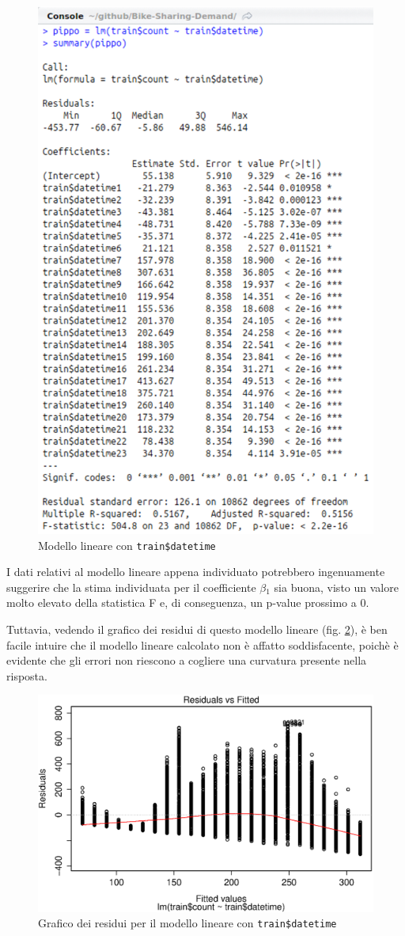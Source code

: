 \begin{figure}[H]
  \centering
  \includegraphics[width=.5\columnwidth]{images/lm/simplest-linear-model.eps}
  \caption{Modello lineare con \texttt{train\$datetime}}
  \label{fig:simplest-linear-model}
\end{figure}

I dati relativi al modello lineare appena individuato potrebbero ingenuamente
suggerire che la stima individuata per il coefficiente $\beta{}_1$ sia buona,
visto un valore molto elevato della statistica F e, di conseguenza, un p-value
prossimo a 0.

Tuttavia, vedendo il grafico dei residui di questo modello lineare (fig.
\ref{fig:simpl-mod-lin-residuals}), è ben facile intuire che il modello lineare
calcolato non è affatto soddisfacente, poichè è evidente che gli errori non
riescono a cogliere una curvatura presente nella risposta.

\begin{figure}[H]
  \centering
  \includegraphics[width=.7\columnwidth]{images/lm/simple-linear-model-plot.eps}
  \caption{Grafico dei residui per il modello lineare con
  \texttt{train\$datetime}}
  \label{fig:simpl-mod-lin-residuals}
\end{figure}

